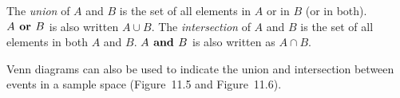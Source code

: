 	\par
      \label{m39377*eip-256}The \textsl{union} of
\begin{math}A\end{math} and \begin{math}B\end{math} is the set of all elements in \begin{math}A\end{math} or in \begin{math}B\end{math} (or in both). \begin{math}A\phantom{\rule{4pt}{0ex}}\mathbf{or}\phantom{\rule{4pt}{0ex}}B\end{math} is also written \begin{math}A\cup B\end{math}. The \textsl{intersection} of \begin{math}A\end{math} and \begin{math}B\end{math} is the set of all elements in both
\begin{math}A\end{math} and \begin{math}B\end{math}. 
\begin{math}A\phantom{\rule{4pt}{0ex}}\mathbf{and}\phantom{\rule{4pt}{0ex}}B\end{math} is also written as \begin{math}A\cap B\end{math}.\par \label{m39377*eip-429}Venn diagrams can also be used to indicate the
union and intersection between events in a sample space (Figure~11.5 and Figure~11.6).\par 

    \setcounter{subfigure}{0}


